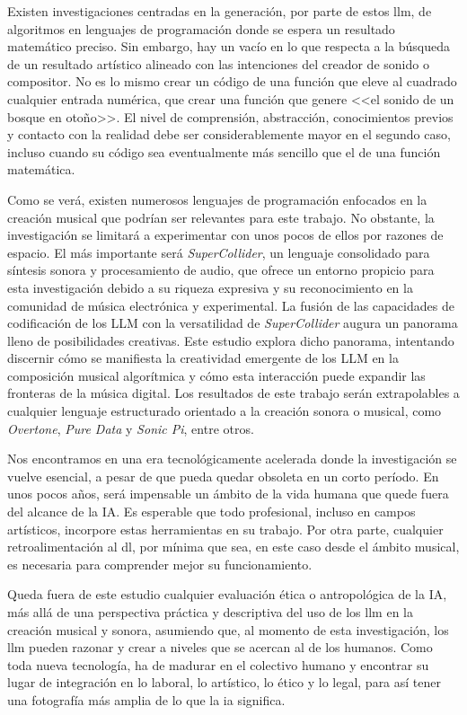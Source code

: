 Existen investigaciones centradas en la generación, por parte de estos \gls{llm}, de algoritmos en lenguajes de programación donde se espera un resultado matemático preciso. Sin embargo, hay un vacío en lo que respecta a la búsqueda de un resultado artístico alineado con las intenciones del creador de sonido o compositor. No es lo mismo crear un código de una función que eleve al cuadrado cualquier entrada numérica, que crear una función que genere <<el sonido de un bosque en otoño>>. El nivel de comprensión, abstracción, conocimientos previos y contacto con la realidad debe ser considerablemente mayor en el segundo caso, incluso cuando su código sea eventualmente más sencillo que el de una función matemática.

Como se verá, existen numerosos lenguajes de programación enfocados en la creación musical que podrían ser relevantes para este trabajo. No obstante, la investigación se limitará a experimentar con unos pocos de ellos por razones de espacio. El más importante será \textit{SuperCollider}, un lenguaje consolidado para síntesis sonora y procesamiento de audio, que ofrece un entorno propicio para esta investigación debido a su riqueza expresiva y su reconocimiento en la comunidad de música electrónica y experimental. La fusión de las capacidades de codificación de los LLM con la versatilidad de \textit{SuperCollider} augura un panorama lleno de posibilidades creativas. Este estudio explora dicho panorama, intentando discernir cómo se manifiesta la creatividad emergente de los LLM en la composición musical algorítmica y cómo esta interacción puede expandir las fronteras de la música digital. Los resultados de este trabajo serán extrapolables a cualquier lenguaje estructurado orientado a la creación sonora o musical, como \textit{Overtone}, \textit{Pure Data} y \textit{Sonic Pi}, entre otros.

Nos encontramos en una era tecnológicamente acelerada donde la investigación se vuelve esencial, a pesar de que pueda quedar obsoleta en un corto período. En unos pocos años, será impensable un ámbito de la vida humana que quede fuera del alcance de la IA. Es esperable que todo profesional, incluso en campos artísticos, incorpore estas herramientas en su trabajo. Por otra parte, cualquier retroalimentación al \gls{dl}, por mínima que sea, en este caso desde el ámbito musical, es necesaria para comprender mejor su funcionamiento.

Queda fuera de este estudio cualquier evaluación ética o antropológica de la IA, más allá de una perspectiva práctica y descriptiva del uso de los \gls{llm} en la creación musical y sonora, asumiendo que, al momento de esta investigación, los \gls{llm} pueden razonar y crear a niveles que se acercan al de los humanos. Como toda nueva tecnología, ha de madurar en el colectivo humano y encontrar su lugar de integración en lo laboral, lo artístico, lo ético y lo legal, para así tener una fotografía más amplia de lo que la \gls{ia} significa.
